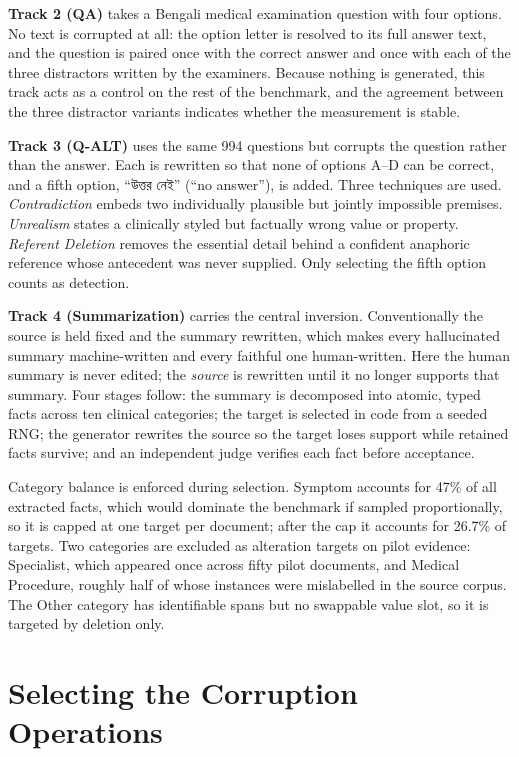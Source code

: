 \documentclass{iutbscthesis}
\newcommand{\bng}[1]{{\bn #1}}
\begin{document}
\textbf{Track 2 (QA)} takes a Bengali medical examination question with four options. No text is corrupted at all: the option letter is resolved to its full answer text, and the question is paired once with the correct answer and once with each of the three distractors written by the examiners. Because nothing is generated, this track acts as a control on the rest of the benchmark, and the agreement between the three distractor variants indicates whether the measurement is stable.

\textbf{Track 3 (Q-ALT)} uses the same 994 questions but corrupts the question rather than the answer. Each is rewritten so that none of options A--D can be correct, and a fifth option, \bng{``উত্তর নেই''} (``no answer''), is added. Three techniques are used. \emph{Contradiction} embeds two individually plausible but jointly impossible premises. \emph{Unrealism} states a clinically styled but factually wrong value or property. \emph{Referent Deletion} removes the essential detail behind a confident anaphoric reference whose antecedent was never supplied. Only selecting the fifth option counts as detection.

\textbf{Track 4 (Summarization)} carries the central inversion. Conventionally the source is held fixed and the summary rewritten, which makes every hallucinated summary machine-written and every faithful one human-written. Here the human summary is never edited; the \emph{source} is rewritten until it no longer supports that summary. Four stages follow: the summary is decomposed into atomic, typed facts across ten clinical categories; the target is selected in code from a seeded RNG; the generator rewrites the source so the target loses support while retained facts survive; and an independent judge verifies each fact before acceptance.

Category balance is enforced during selection. Symptom accounts for 47\% of all extracted facts, which would dominate the benchmark if sampled proportionally, so it is capped at one target per document; after the cap it accounts for 26.7\% of targets. Two categories are excluded as alteration targets on pilot evidence: Specialist, which appeared once across fifty pilot documents, and Medical Procedure, roughly half of whose instances were mislabelled in the source corpus. The Other category has identifiable spans but no swappable value slot, so it is targeted by deletion only.

\section{Selecting the Corruption Operations}
\end{document}

